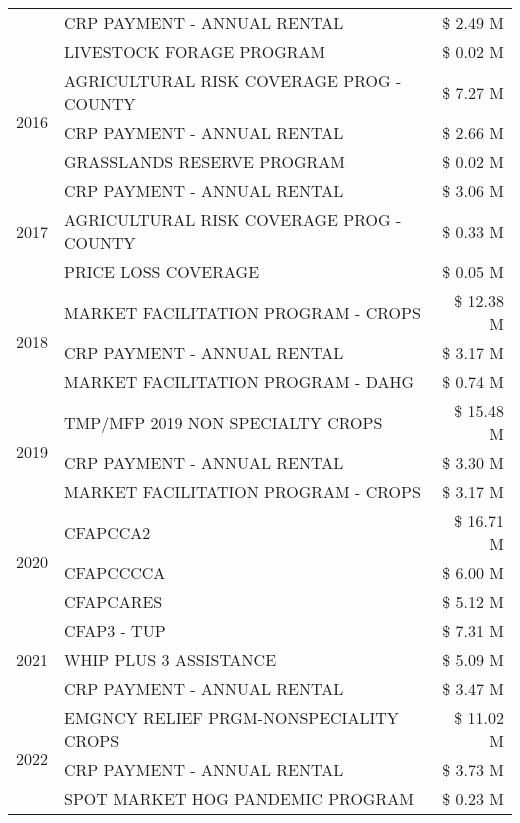 \begin{tabular}{llr}
 & CRP PAYMENT - ANNUAL RENTAL & \$ 2.49 M \\
 & LIVESTOCK FORAGE PROGRAM & \$ 0.02 M \\
\cline{1-3}
\multirow[t]{3}{*}{2016} & AGRICULTURAL RISK COVERAGE PROG - COUNTY & \$ 7.27 M \\
 & CRP PAYMENT - ANNUAL RENTAL & \$ 2.66 M \\
 & GRASSLANDS RESERVE PROGRAM & \$ 0.02 M \\
\cline{1-3}
\multirow[t]{3}{*}{2017} & CRP PAYMENT - ANNUAL RENTAL & \$ 3.06 M \\
 & AGRICULTURAL RISK COVERAGE PROG - COUNTY & \$ 0.33 M \\
 & PRICE LOSS COVERAGE & \$ 0.05 M \\
\cline{1-3}
\multirow[t]{3}{*}{2018} & MARKET FACILITATION PROGRAM - CROPS & \$ 12.38 M \\
 & CRP PAYMENT - ANNUAL RENTAL & \$ 3.17 M \\
 & MARKET FACILITATION PROGRAM - DAHG & \$ 0.74 M \\
\cline{1-3}
\multirow[t]{3}{*}{2019} & TMP/MFP 2019 NON SPECIALTY CROPS & \$ 15.48 M \\
 & CRP PAYMENT - ANNUAL RENTAL & \$ 3.30 M \\
 & MARKET FACILITATION PROGRAM - CROPS & \$ 3.17 M \\
\cline{1-3}
\multirow[t]{3}{*}{2020} & CFAPCCA2 & \$ 16.71 M \\
 & CFAPCCCCA & \$ 6.00 M \\
 & CFAPCARES & \$ 5.12 M \\
\cline{1-3}
\multirow[t]{3}{*}{2021} & CFAP3 - TUP & \$ 7.31 M \\
 & WHIP PLUS 3 ASSISTANCE & \$ 5.09 M \\
 & CRP PAYMENT - ANNUAL RENTAL & \$ 3.47 M \\
\cline{1-3}
\multirow[t]{3}{*}{2022} & EMGNCY RELIEF PRGM-NONSPECIALITY CROPS & \$ 11.02 M \\
 & CRP PAYMENT - ANNUAL RENTAL & \$ 3.73 M \\
 & SPOT MARKET HOG PANDEMIC PROGRAM & \$ 0.23 M \\
\cline{1-3}
\bottomrule
\end{tabular}
